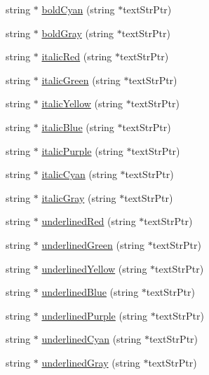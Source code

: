 \begin{DoxyCompactItemize}
\item 
string $\ast$ \hyperlink{namespace_windows_console_text_ad663bdad1383d48b6202cbe2d22f7c2e}{bold\-Cyan} (string $\ast$text\-Str\-Ptr)
\item 
string $\ast$ \hyperlink{namespace_windows_console_text_ae4eabe670d07ffade22db0e87aee5249}{bold\-Gray} (string $\ast$text\-Str\-Ptr)
\item 
string $\ast$ \hyperlink{namespace_windows_console_text_a71db4269f200b021de61913d2b7903f2}{italic\-Red} (string $\ast$text\-Str\-Ptr)
\item 
string $\ast$ \hyperlink{namespace_windows_console_text_ae8a44033301cf0b159f890bb17e9ade0}{italic\-Green} (string $\ast$text\-Str\-Ptr)
\item 
string $\ast$ \hyperlink{namespace_windows_console_text_af7505c56ac71c073a30f9c7497ea5dd8}{italic\-Yellow} (string $\ast$text\-Str\-Ptr)
\item 
string $\ast$ \hyperlink{namespace_windows_console_text_a43e272994e8370c6cc1e8289872cc3f1}{italic\-Blue} (string $\ast$text\-Str\-Ptr)
\item 
string $\ast$ \hyperlink{namespace_windows_console_text_a2ccdabfc1d8ffe166c063c039bd0a674}{italic\-Purple} (string $\ast$text\-Str\-Ptr)
\item 
string $\ast$ \hyperlink{namespace_windows_console_text_adeb5de271a3357ae4e3cca4faa7a2f1c}{italic\-Cyan} (string $\ast$text\-Str\-Ptr)
\item 
string $\ast$ \hyperlink{namespace_windows_console_text_a4263561267b05b8eb062d4291ad48156}{italic\-Gray} (string $\ast$text\-Str\-Ptr)
\item 
string $\ast$ \hyperlink{namespace_windows_console_text_a58b2e71e3c82e6a5fd9470d94fd0e339}{underlined\-Red} (string $\ast$text\-Str\-Ptr)
\item 
string $\ast$ \hyperlink{namespace_windows_console_text_ae2d3c6f156dfd20fbcaf002f60c3063a}{underlined\-Green} (string $\ast$text\-Str\-Ptr)
\item 
string $\ast$ \hyperlink{namespace_windows_console_text_ae57c84df042a9ea941f83edd16e3c24a}{underlined\-Yellow} (string $\ast$text\-Str\-Ptr)
\item 
string $\ast$ \hyperlink{namespace_windows_console_text_a318921dc20bbc206b4c20f5c20fcd01f}{underlined\-Blue} (string $\ast$text\-Str\-Ptr)
\item 
string $\ast$ \hyperlink{namespace_windows_console_text_adddcdb4ed3b84b741d98d0e1ea2e4921}{underlined\-Purple} (string $\ast$text\-Str\-Ptr)
\item 
string $\ast$ \hyperlink{namespace_windows_console_text_a20c98475a28eb10d06e9dd2a6259ce5b}{underlined\-Cyan} (string $\ast$text\-Str\-Ptr)
\item 
string $\ast$ \hyperlink{namespace_windows_console_text_acc55d1a6037d60c533ebfb742b594b9f}{underlined\-Gray} (string $\ast$text\-Str\-Ptr)
\end{DoxyCompactItemize}



